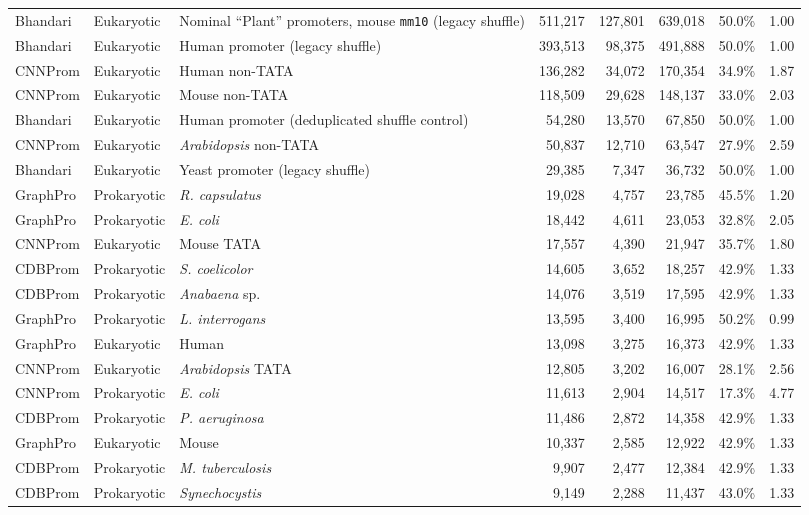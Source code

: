 \begin{longtable}{@{}lllrrrrr@{}}
Bhandari & Eukaryotic & Nominal ``Plant'' promoters, mouse \texttt{mm10} (legacy shuffle) & 511,217 & 127,801 & 639,018 & 50.0\% & 1.00 \\
Bhandari & Eukaryotic & Human promoter (legacy shuffle) & 393,513 & 98,375 & 491,888 & 50.0\% & 1.00 \\
CNNProm & Eukaryotic & Human non-TATA & 136,282 & 34,072 & 170,354 & 34.9\% & 1.87 \\
CNNProm & Eukaryotic & Mouse non-TATA & 118,509 & 29,628 & 148,137 & 33.0\% & 2.03 \\
Bhandari & Eukaryotic & Human promoter (deduplicated shuffle control) & 54,280 & 13,570 & 67,850 & 50.0\% & 1.00 \\
CNNProm & Eukaryotic & \textit{Arabidopsis} non-TATA & 50,837 & 12,710 & 63,547 & 27.9\% & 2.59 \\
Bhandari & Eukaryotic & Yeast promoter (legacy shuffle) & 29,385 & 7,347 & 36,732 & 50.0\% & 1.00 \\
GraphPro & Prokaryotic & \textit{R. capsulatus} & 19,028 & 4,757 & 23,785 & 45.5\% & 1.20 \\
GraphPro & Prokaryotic & \textit{E. coli} & 18,442 & 4,611 & 23,053 & 32.8\% & 2.05 \\
CNNProm & Eukaryotic & Mouse TATA & 17,557 & 4,390 & 21,947 & 35.7\% & 1.80 \\
CDBProm & Prokaryotic & \textit{S. coelicolor} & 14,605 & 3,652 & 18,257 & 42.9\% & 1.33 \\
CDBProm & Prokaryotic & \textit{Anabaena} sp. & 14,076 & 3,519 & 17,595 & 42.9\% & 1.33 \\
GraphPro & Prokaryotic & \textit{L. interrogans} & 13,595 & 3,400 & 16,995 & 50.2\% & 0.99 \\
GraphPro & Eukaryotic & Human & 13,098 & 3,275 & 16,373 & 42.9\% & 1.33 \\
CNNProm & Eukaryotic & \textit{Arabidopsis} TATA & 12,805 & 3,202 & 16,007 & 28.1\% & 2.56 \\
CNNProm & Prokaryotic & \textit{E. coli} & 11,613 & 2,904 & 14,517 & 17.3\% & 4.77 \\
CDBProm & Prokaryotic & \textit{P. aeruginosa} & 11,486 & 2,872 & 14,358 & 42.9\% & 1.33 \\
GraphPro & Eukaryotic & Mouse & 10,337 & 2,585 & 12,922 & 42.9\% & 1.33 \\
CDBProm & Prokaryotic & \textit{M. tuberculosis} & 9,907 & 2,477 & 12,384 & 42.9\% & 1.33 \\
CDBProm & Prokaryotic & \textit{Synechocystis} & 9,149 & 2,288 & 11,437 & 43.0\% & 1.33 \\

\end{longtable}
